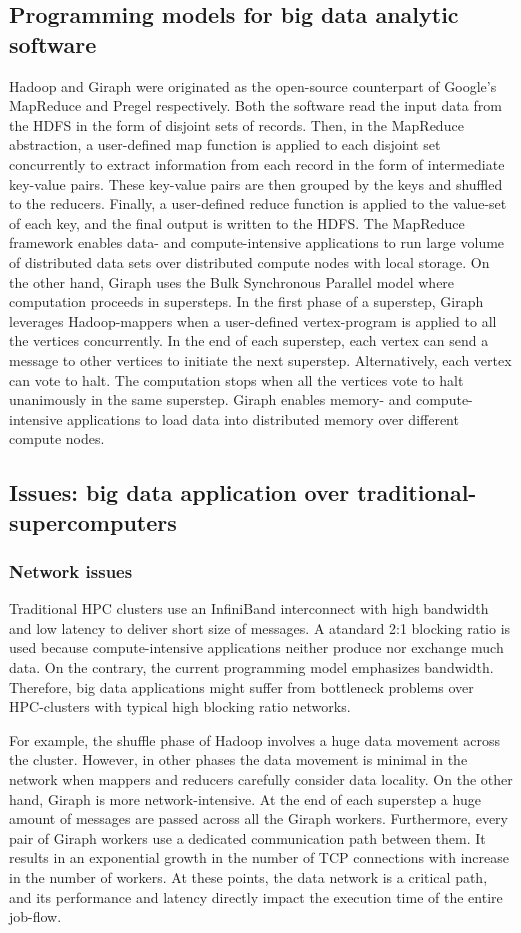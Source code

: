 \documentclass[10pt, conference, compsocconf]{IEEEtran}
\begin{document}
\subsection {Programming models for big data analytic software}
Hadoop and Giraph were originated as the open-source counterpart of Google's MapReduce and Pregel respectively. Both the software read the input data from the HDFS in the form of disjoint sets of records. Then, in the MapReduce abstraction, a user-defined map function is applied to each disjoint set concurrently to extract information from each record in the form of intermediate key-value pairs. These key-value pairs are then grouped by the keys and shuffled to the reducers. Finally, a user-defined reduce function is applied to the value-set of each key, and the final output is written to the HDFS. The MapReduce framework enables data- and compute-intensive applications to run large volume of distributed data sets over distributed compute nodes with local storage. On the other hand, Giraph uses the Bulk Synchronous Parallel model where computation proceeds in supersteps. In the first phase of a superstep, Giraph leverages Hadoop-mappers when a user-defined vertex-program is applied to all the vertices concurrently. In the end of each superstep, each vertex can send a message to other vertices to initiate the next superstep. Alternatively, each vertex can vote to halt. The computation stops when all the vertices vote to halt unanimously in the same superstep. Giraph enables memory- and compute-intensive applications to load data into distributed memory over different compute nodes.
\subsection {Issues: big data application over traditional-supercomputers} 
\subsubsection {Network issues}
Traditional HPC clusters use an InfiniBand interconnect with high bandwidth and low latency to deliver short size of messages. A atandard 2:1 blocking ratio is used because compute-intensive applications neither produce nor exchange much data. On the contrary, the current programming model emphasizes bandwidth. Therefore, big data applications might suffer from bottleneck problems over HPC-clusters with typical high blocking ratio networks.

For example, the shuffle phase of Hadoop involves a huge data movement across the cluster. However, in other phases the data movement is minimal in the network when mappers and reducers carefully consider data locality. On the other hand, Giraph is more network-intensive. At the end of each superstep a huge amount of messages are passed across all the Giraph workers. Furthermore, every pair of Giraph workers use a dedicated communication path between them. It results in an exponential growth in the number of TCP connections with increase in the number of workers. At these points, the data network is a critical path, and its performance and latency directly impact the execution time of the entire job-flow.
\end{document}
